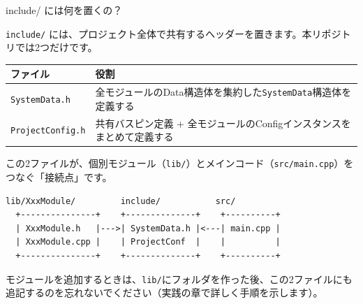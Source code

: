 \begin{qabox}{include/ には何を置くの？}

\texttt{include/} には、プロジェクト全体で共有するヘッダーを置きます。本リポジトリでは2つだけです。

\vspace{2mm}
\begin{tabularx}{\textwidth}{l X}
\toprule
\textbf{ファイル} & \textbf{役割} \\
\midrule
\texttt{SystemData.h} & 全モジュールのData構造体を集約した\texttt{SystemData}構造体を定義する \\
\texttt{ProjectConfig.h} & 共有バスピン定義 + 全モジュールのConfigインスタンスをまとめて定義する \\
\bottomrule
\end{tabularx}

\vspace{2mm}
この2ファイルが、個別モジュール（\texttt{lib/}）とメインコード（\texttt{src/main.cpp}）をつなぐ「接続点」です。

\begin{lstlisting}[language={},keywordstyle={},commentstyle={},stringstyle={},numbers=none,frame=none,backgroundcolor=\color{lightgray},xleftmargin=5pt,framexleftmargin=5pt]
   lib/XxxModule/         include/           src/
  +---------------+    +--------------+    +----------+
  | XxxModule.h   |--->| SystemData.h |<---| main.cpp |
  | XxxModule.cpp |    | ProjectConf  |    |          |
  +---------------+    +--------------+    +----------+
\end{lstlisting}

モジュールを追加するときは、\texttt{lib/}にフォルダを作った後、この2ファイルにも追記するのを忘れないでください（実践の章で詳しく手順を示します）。

\end{qabox}

